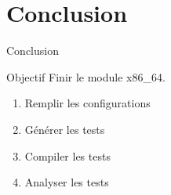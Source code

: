 \documentclass[A4,svgnames,9pt,aspectratio=169]{beamer}
\begin{document}

\section{Conclusion}
\frame{\sectionpage}

\begin{frame}{Conclusion}
  \begin{block}{Objectif}
    Finir le module x86\_64.
  \end{block}

  \begin{enumerate}
    \item Remplir les configurations
    \item Générer les tests
    \item Compiler les tests
    \item Analyser les tests
  \end{enumerate}
  

\end{frame}


\frame{\merci}
\end{document}
